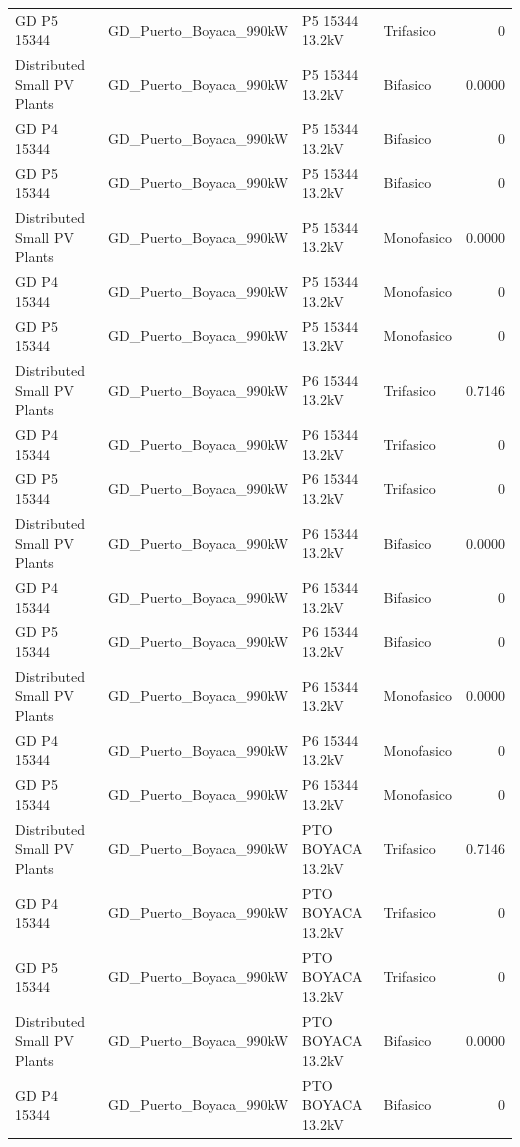 \documentclass[11pt,a4paper]{article}
\begin{document}
\begin{longtable}{llllr}
GD P5 15344 & GD\_Puerto\_Boyaca\_990kW & P5 15344 13.2kV & Trifasico & 0 \\
Distributed Small PV Plants & GD\_Puerto\_Boyaca\_990kW & P5 15344 13.2kV & Bifasico & 0.0000 \\
GD P4 15344 & GD\_Puerto\_Boyaca\_990kW & P5 15344 13.2kV & Bifasico & 0 \\
GD P5 15344 & GD\_Puerto\_Boyaca\_990kW & P5 15344 13.2kV & Bifasico & 0 \\
Distributed Small PV Plants & GD\_Puerto\_Boyaca\_990kW & P5 15344 13.2kV & Monofasico & 0.0000 \\
GD P4 15344 & GD\_Puerto\_Boyaca\_990kW & P5 15344 13.2kV & Monofasico & 0 \\
GD P5 15344 & GD\_Puerto\_Boyaca\_990kW & P5 15344 13.2kV & Monofasico & 0 \\
Distributed Small PV Plants & GD\_Puerto\_Boyaca\_990kW & P6 15344 13.2kV & Trifasico & 0.7146 \\
GD P4 15344 & GD\_Puerto\_Boyaca\_990kW & P6 15344 13.2kV & Trifasico & 0 \\
GD P5 15344 & GD\_Puerto\_Boyaca\_990kW & P6 15344 13.2kV & Trifasico & 0 \\
Distributed Small PV Plants & GD\_Puerto\_Boyaca\_990kW & P6 15344 13.2kV & Bifasico & 0.0000 \\
GD P4 15344 & GD\_Puerto\_Boyaca\_990kW & P6 15344 13.2kV & Bifasico & 0 \\
GD P5 15344 & GD\_Puerto\_Boyaca\_990kW & P6 15344 13.2kV & Bifasico & 0 \\
Distributed Small PV Plants & GD\_Puerto\_Boyaca\_990kW & P6 15344 13.2kV & Monofasico & 0.0000 \\
GD P4 15344 & GD\_Puerto\_Boyaca\_990kW & P6 15344 13.2kV & Monofasico & 0 \\
GD P5 15344 & GD\_Puerto\_Boyaca\_990kW & P6 15344 13.2kV & Monofasico & 0 \\
Distributed Small PV Plants & GD\_Puerto\_Boyaca\_990kW & PTO BOYACA 13.2kV & Trifasico & 0.7146 \\
GD P4 15344 & GD\_Puerto\_Boyaca\_990kW & PTO BOYACA 13.2kV & Trifasico & 0 \\
GD P5 15344 & GD\_Puerto\_Boyaca\_990kW & PTO BOYACA 13.2kV & Trifasico & 0 \\
Distributed Small PV Plants & GD\_Puerto\_Boyaca\_990kW & PTO BOYACA 13.2kV & Bifasico & 0.0000 \\
GD P4 15344 & GD\_Puerto\_Boyaca\_990kW & PTO BOYACA 13.2kV & Bifasico & 0 \\

\end{longtable}
\end{document}
